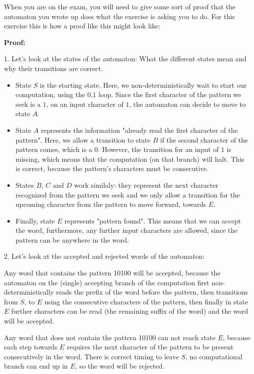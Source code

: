 When you are on the exam, you will need to give some sort of proof that the automaton you wrote up does what the exercise is asking you to do. For this exercise this is how a proof like this might look like:

\textbf{Proof:}

1. Let's look at the states of the automaton:
What the different states mean and why their transitions are correct.
\begin{itemize}
    \item State $S$ is the starting state. Here, we non-deterministically wait to start our computation, using the $0$,$1$ loop. Since the first character of the pattern we seek is a $1$, on an input character of $1$, the automaton can decide to move to state $A$.
    \item State $A$ represents the information "already read the first character of the pattern". Here, we allow a transition to state $B$ if the second character of the pattern comes, which is a $0$. However, the transition for an input of $1$ is missing, which means that the computation (on that branch) will halt. This is correct, because the pattern's characters must be consecutive.
    \item States $B$, $C$ and $D$ work similaly: they represent the next character recognized from the pattern we seek and we only allow a transition for the upcoming character from the pattern to move forward, towards $E$.
    \item Finally, state $E$ represents "pattern found". This means that we can accept the word, furthermore, any further input characters are allowed, since the pattern can be anywhere in the word.
\end{itemize}

2. Let's look at the accepted and rejected words of the automaton:

Any word that contains the pattern 10100 will be accepted, because the automaton on the (single) accepting branch of the computation first non-deterministically reads the prefix of the word before the pattern, then transitions from $S$, to $E$ using the consecutive characters of the pattern, then finally in state $E$ further characters can be read (the remaining suffix of the word) and the word will be accepted.

Any word that does not contain the pattern 10100 can not reach state $E$, because each step towards $E$ requires the next character of the pattern to be present consecutively in the word. There is correct timing to leave $S$, no computational branch can end up in $E$, so the word will be rejected.

